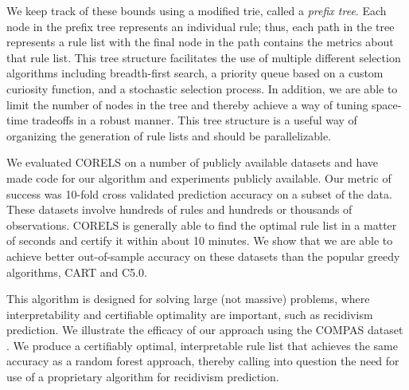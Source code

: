 We keep track of these bounds using a modified trie, called a \emph{prefix tree}. Each node in the prefix tree represents an individual rule; thus, each path in the tree represents a rule list with the final node in the path contains the metrics about that rule list. This tree structure facilitates the use of multiple different selection algorithms including breadth-first search, a priority queue based on a custom curiosity function, and a stochastic selection process. In addition, we are able to limit the number of nodes in the tree and thereby achieve a way of tuning space-time tradeoffs in a robust manner. This tree structure is a useful way of organizing the generation of rule lists and should be parallelizable.

\begin{arxiv}
We evaluated CORELS on a number of publicly available datasets and have made code for our algorithm and experiments publicly available. Our metric of success was 10-fold cross validated prediction accuracy on a subset of the data. These datasets involve hundreds of rules and hundreds or thousands of observations. CORELS is generally able to find the optimal rule list in a matter of seconds and certify it within about 10 minutes. We show that we are able to achieve better out-of-sample accuracy on these datasets than the popular greedy algorithms, CART and C5.0.
\end{arxiv}

This algorithm is designed for solving large (not massive) problems, where interpretability and certifiable optimality are important, such as recidivism prediction. We illustrate the efficacy of our approach using the COMPAS dataset \cite{LarsonMaKiAn16}. We produce a certifiably optimal, interpretable rule list that achieves the same accuracy as a random forest approach, thereby calling into question the need for use of a proprietary algorithm for recidivism prediction.

%
%
%
%
